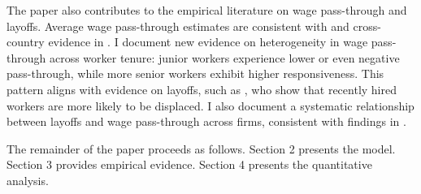 The paper also contributes to the empirical literature on wage pass-through and layoffs. Average wage pass-through estimates are consistent with \textcite{souchier2022} and cross-country evidence in \textcite{guvenen2017,guiso2020}. I document new evidence on heterogeneity in wage pass-through across worker tenure: junior workers experience lower or even negative pass-through, while more senior workers exhibit higher responsiveness. This pattern aligns with evidence on layoffs, such as \textcite{buhai2014}, who show that recently hired workers are more likely to be displaced. I also document a systematic relationship between layoffs and wage pass-through across firms, consistent with findings in \textcite{dias2013,enrlich2024}.

The remainder of the paper proceeds as follows. Section 2 presents the model. Section 3 provides empirical evidence. Section 4 presents the quantitative analysis.
